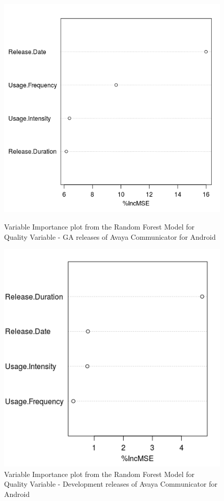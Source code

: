 \documentclass[smallextended]{svjour3}       %
\begin{document}
\begin{figure}[!t]
\begin{minipage}{.45\textwidth}
\raggedleft
\includegraphics[width=\linewidth]{rfqAGA}
\caption{Variable Importance plot from the Random Forest  Model for Quality Variable - GA releases of Avaya Communicator for Android}
\label{fig:rf2AGA}
\end{minipage}
\hfill
\begin{minipage}{.45\textwidth}
\raggedright 
\includegraphics[width=\linewidth]{rfqAD}
\caption{Variable Importance plot from the Random Forest  Model for Quality Variable - Development releases of Avaya Communicator for Android}
\label{fig:rf2AD}
\end{minipage}
\end{figure}
\end{document}
